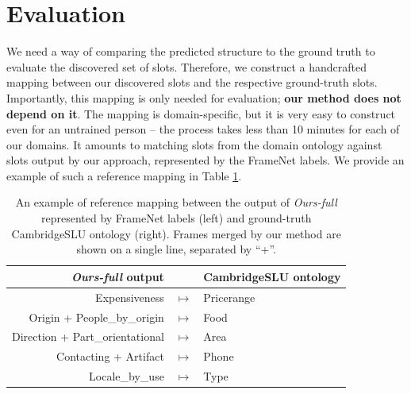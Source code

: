 \section{Evaluation}
We need a way of comparing the predicted structure to the ground truth to evaluate the discovered set of slots.
Therefore, we construct a handcrafted mapping between our discovered slots and the respective ground-truth slots.
Importantly, this mapping is only needed for evaluation; \textbf{our method does not depend on it}.
The mapping is domain-specific, but it is very easy to construct even for an untrained person -- the process takes less than 10 minutes for each of our domains.
It amounts to matching slots from the domain ontology against slots output by our approach, represented by the FrameNet labels.
We provide an example of such a reference mapping in Table \ref{03:ref_mapping}.
\label{sec:app-ref-mapping}

\begin{table}[tp]
    \centering
    \small
    \begin{tabular}{rcl}
    \textbf{\emph{Ours-full} output} & & \textbf{CambridgeSLU ontology}\\\hline
     Expensiveness & $ \mapsto$ & Pricerange\\
     Origin + People\_by\_origin & $ \mapsto$ & Food\\
     Direction + Part\_orientational & $ \mapsto$ & Area\\
     Contacting + Artifact & $ \mapsto$ & Phone\\
     Locale\_by\_use & $ \mapsto$ & Type \\
     

    \end{tabular}
    \caption{An example of reference mapping between the output of \emph{Ours-full} represented by FrameNet labels (left) and ground-truth CambridgeSLU ontology (right).
    Frames merged by our method are shown on a single line, separated by “+”.
    }
    \label{03:ref_mapping}
\end{table}

